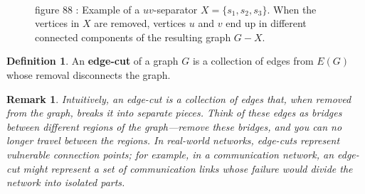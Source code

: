 \documentclass{article}
\newtheorem{remark}{Remark}
\theoremstyle{definition}
\newtheorem{definition}{Definition}
\begin{document}
\begin{figure}[ht]
\\
\small figure 88 : {Example of a $uv$-separator $X = \{s_1, s_2, s_3\}$. When the vertices in $X$ are removed, vertices $u$ and $v$ end up in different connected components of the resulting graph $G - X$.}
\label{fig:uv-separator}
\end{figure}

\begin{definition}
    An \textbf{edge-cut} of a graph $G$ is a collection of edges from $E(G)$ whose removal disconnects the graph.
\end{definition}

\begin{remark}
Intuitively, an edge-cut is a collection of edges that, when removed from the graph, breaks it into separate pieces. Think of these edges as bridges between different regions of the graph—remove these bridges, and you can no longer travel between the regions. In real-world networks, edge-cuts represent vulnerable connection points; for example, in a communication network, an edge-cut might represent a set of communication links whose failure would divide the network into isolated parts.
\end{remark}
\end{document}
